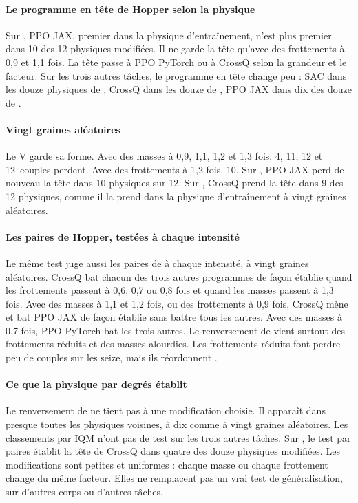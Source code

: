 \paragraph{Le programme en tête de Hopper selon la physique}
Sur , PPO JAX, premier dans la physique d'entraînement, n'est plus premier dans 10 des 12 physiques
modifiées. Il ne garde la tête qu'avec des frottements à 0,9 et 1,1 fois. La tête passe à PPO PyTorch ou à
CrossQ selon la grandeur et le facteur. Sur les trois autres tâches, le programme en tête change peu : SAC dans
les douze physiques de , CrossQ dans les douze de , PPO JAX dans dix des douze
de .

\paragraph{Vingt graines aléatoires}
Le V garde sa forme. Avec des masses à 0,9, 1,1, 1,2 et 1,3 fois, 4, 11, 12 et 12~couples perdent. Avec des
frottements à 1,2 fois, 10. Sur , PPO JAX perd de nouveau la tête dans 10 physiques sur 12. Sur
, CrossQ prend la tête dans 9 des 12 physiques, comme il la prend dans la physique d'entraînement
à vingt graines aléatoires.

\paragraph{Les paires de Hopper, testées à chaque intensité}
Le même test juge aussi les paires de  à chaque intensité, à vingt graines aléatoires. CrossQ
bat chacun des trois autres programmes de
façon établie quand les frottements passent à 0,6, 0,7 ou 0,8 fois et quand les masses passent à 1,3 fois.
Avec des masses à 1,1 et 1,2 fois, ou des frottements à 0,9 fois, CrossQ mène et bat PPO JAX de façon établie
sans battre tous les autres. Avec des masses à 0,7 fois, PPO PyTorch bat les trois autres. Le
renversement de  vient surtout des frottements réduits et des masses alourdies. Les frottements
réduits font perdre peu de couples sur les seize, mais ils réordonnent .

\paragraph{Ce que la physique par degrés établit}
Le renversement de  ne tient pas à une modification choisie. Il apparaît dans presque toutes les
physiques voisines, à dix comme à vingt graines aléatoires. Les classements par IQM n'ont pas de test sur les
trois autres tâches. Sur , le test par paires établit la tête de CrossQ dans quatre des douze
physiques modifiées. Les
modifications sont petites et uniformes : chaque masse ou chaque frottement change du même facteur. Elles ne
remplacent pas un vrai test de généralisation, sur d'autres corps ou d'autres tâches.

